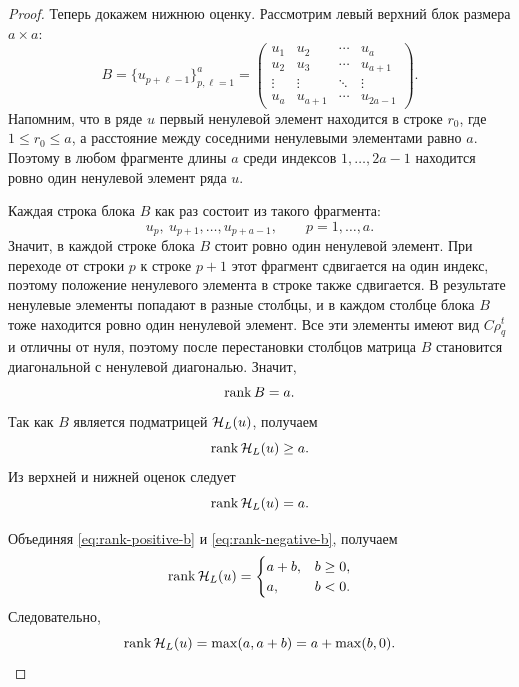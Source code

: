 \begin{proof}
Теперь докажем нижнюю оценку. Рассмотрим левый верхний блок размера $a\times a$:
\begin{equation*}
    B
    =
    \{u_{p+\ell-1}\}_{p,\ell=1}^{a}
    =
    \begin{pmatrix}
        u_1 & u_2 & \cdots & u_a \\
        u_2 & u_3 & \cdots & u_{a+1} \\
        \vdots & \vdots & \ddots & \vdots \\
        u_a & u_{a+1} & \cdots & u_{2a-1}
    \end{pmatrix}.
\end{equation*}
Напомним, что в ряде $u$ первый ненулевой элемент находится в строке
$r_0$, где $1\le r_0\le a$, а расстояние между соседними ненулевыми
элементами равно $a$. Поэтому в любом фрагменте длины $a$ среди индексов
$1,\dots,2a-1$ находится ровно один ненулевой элемент ряда $u$.

Каждая строка блока $B$ как раз состоит из такого фрагмента:
\[
    u_p,\ u_{p+1},\dots,u_{p+a-1},
    \qquad p=1,\dots,a.
\]
Значит, в каждой строке блока $B$ стоит ровно один ненулевой элемент.
При переходе от строки $p$ к строке $p+1$ этот фрагмент сдвигается на один
индекс, поэтому положение ненулевого элемента в строке также сдвигается.
В результате ненулевые элементы попадают в разные столбцы, и в каждом
столбце блока $B$ тоже находится ровно один ненулевой элемент. Все эти
элементы имеют вид $C\rho_q^t$ и отличны от нуля, поэтому после перестановки
столбцов матрица $B$ становится диагональной с ненулевой диагональю. Значит,
\begin{equation*}
    \operatorname{rank} B=a.
\end{equation*}
Так как $B$ является подматрицей $\mathcal H_L(u)$, получаем
\begin{equation*}
    \operatorname{rank} \mathcal H_L(u)\ge a.
\end{equation*}
Из верхней и нижней оценок следует
\begin{equation}
    \operatorname{rank} \mathcal H_L(u)=a.
    \label{eq:rank-negative-b}
\end{equation}

Объединяя \eqref{eq:rank-positive-b} и \eqref{eq:rank-negative-b}, получаем
\begin{equation}
    \operatorname{rank} \mathcal H_L(u)
    =
    \begin{cases}
        a+b, & b\ge0,\\
        a, & b<0.
    \end{cases}
    \label{eq:piecewise-rank}
\end{equation}
Следовательно,
\begin{equation*}
    \operatorname{rank} \mathcal H_L(u)
    =
    \max(a,a+b)
    =
    a+\max(b,0).
\end{equation*}
\end{proof}

